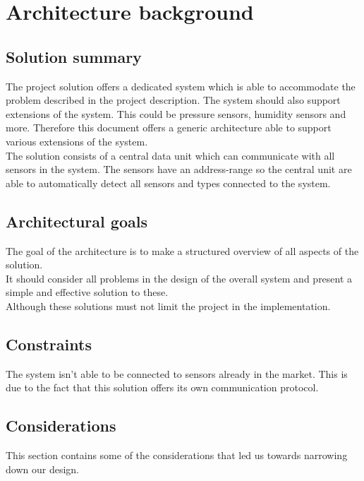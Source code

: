 \chapter{Architecture background}

\section{Solution summary}
The project solution offers a dedicated system which is able to accommodate the problem described in the project description. The system should also support extensions of the system. This could be pressure sensors, humidity sensors and more. Therefore this document offers a generic architecture able to support various extensions of the system.\\
The solution consists of a central data unit which can communicate with all sensors in the system. The sensors have an address-range so the central unit are able to automatically detect all sensors and types connected to the system. 

\section{Architectural goals}
The goal of the architecture is to make a structured overview of all aspects of the solution.\\
It should consider all problems in the design of the overall system and present a simple and effective solution to these.\\
Although these solutions must not limit the project in the  implementation.\\

\section{Constraints}
The system isn't able to be connected to sensors already in the market. This is due to the fact that this solution offers its own communication protocol.\\

\section{Considerations}
This section contains some of the considerations that led us towards narrowing down our design.
